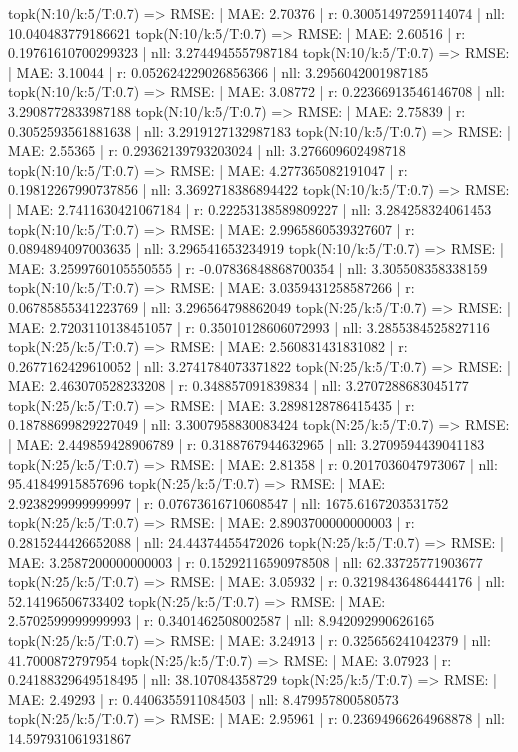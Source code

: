topk(N:10/k:5/T:0.7) => RMSE: | MAE: 2.70376 | r: 0.30051497259114074 | nll: 10.040483779186621
topk(N:10/k:5/T:0.7) => RMSE: | MAE: 2.60516 | r: 0.19761610700299323 | nll: 3.2744945557987184
topk(N:10/k:5/T:0.7) => RMSE: | MAE: 3.10044 | r: 0.052624229026856366 | nll: 3.2956042001987185
topk(N:10/k:5/T:0.7) => RMSE: | MAE: 3.08772 | r: 0.22366913546146708 | nll: 3.2908772833987188
topk(N:10/k:5/T:0.7) => RMSE: | MAE: 2.75839 | r: 0.3052593561881638 | nll: 3.2919127132987183
topk(N:10/k:5/T:0.7) => RMSE: | MAE: 2.55365 | r: 0.29362139793203024 | nll: 3.276609602498718
topk(N:10/k:5/T:0.7) => RMSE: | MAE: 4.277365082191047 | r: 0.19812267990737856 | nll: 3.3692718386894422
topk(N:10/k:5/T:0.7) => RMSE: | MAE: 2.7411630421067184 | r: 0.22253138589809227 | nll: 3.284258324061453
topk(N:10/k:5/T:0.7) => RMSE: | MAE: 2.9965860539327607 | r: 0.0894894097003635 | nll: 3.296541653234919
topk(N:10/k:5/T:0.7) => RMSE: | MAE: 3.2599760105550555 | r: -0.07836848868700354 | nll: 3.305508358338159
topk(N:10/k:5/T:0.7) => RMSE: | MAE: 3.0359431258587266 | r: 0.06785855341223769 | nll: 3.296564798862049
topk(N:25/k:5/T:0.7) => RMSE: | MAE: 2.7203110138451057 | r: 0.35010128606072993 | nll: 3.2855384525827116
topk(N:25/k:5/T:0.7) => RMSE: | MAE: 2.560831431831082 | r: 0.2677162429610052 | nll: 3.2741784073371822
topk(N:25/k:5/T:0.7) => RMSE: | MAE: 2.463070528233208 | r: 0.348857091839834 | nll: 3.2707288683045177
topk(N:25/k:5/T:0.7) => RMSE: | MAE: 3.2898128786415435 | r: 0.18788699829227049 | nll: 3.3007958830083424
topk(N:25/k:5/T:0.7) => RMSE: | MAE: 2.449859428906789 | r: 0.3188767944632965 | nll: 3.2709594439041183
topk(N:25/k:5/T:0.7) => RMSE: | MAE: 2.81358 | r: 0.2017036047973067 | nll: 95.41849915857696
topk(N:25/k:5/T:0.7) => RMSE: | MAE: 2.9238299999999997 | r: 0.07673616710608547 | nll: 1675.6167203531752
topk(N:25/k:5/T:0.7) => RMSE: | MAE: 2.8903700000000003 | r: 0.2815244426652088 | nll: 24.44374455472026
topk(N:25/k:5/T:0.7) => RMSE: | MAE: 3.2587200000000003 | r: 0.15292116590978508 | nll: 62.33725771903677
topk(N:25/k:5/T:0.7) => RMSE: | MAE: 3.05932 | r: 0.32198436486444176 | nll: 52.14196506733402
topk(N:25/k:5/T:0.7) => RMSE: | MAE: 2.5702599999999993 | r: 0.3401462508002587 | nll: 8.942092990626165
topk(N:25/k:5/T:0.7) => RMSE: | MAE: 3.24913 | r: 0.325656241042379 | nll: 41.7000872797954
topk(N:25/k:5/T:0.7) => RMSE: | MAE: 3.07923 | r: 0.24188329649518495 | nll: 38.107084358729
topk(N:25/k:5/T:0.7) => RMSE: | MAE: 2.49293 | r: 0.4406355911084503 | nll: 8.479957800580573
topk(N:25/k:5/T:0.7) => RMSE: | MAE: 2.95961 | r: 0.23694966264968878 | nll: 14.597931061931867
